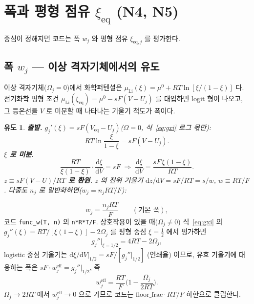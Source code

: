 \documentclass[11pt,a4paper]{article}
\newtheorem*{derivebox}{유도}
\newcommand{\dd}{\mathrm{d}}
\newcommand{\eff}{\mathrm{eff}}
\newcommand{\eq}{\mathrm{eq}}
\newcommand{\code}[1]{\texttt{#1}}
\begin{document}
\section{폭과 평형 점유 $\xi_\eq$ (N4, N5)}\label{sec:width}
중심이 정해지면 코드는 폭 $w_j$ 와 평형 점유 $\xi_{\eq,j}$ 를 평가한다.

\subsection{폭 $w_j$ — 이상 격자기체에서의 유도}

이상 격자기체($\Omega_j=0$)에서 화학퍼텐셜은 $\mu_{\mathrm{Li}}(\xi)=\mu^0+RT\ln[\xi/(1-\xi)]$ 다.
전기화학 평형 조건 $\mu_{\mathrm{Li}}(\xi_\eq)=\mu^0-sF(V-U_j)$ 를 대입하면 logit 형이 나오고, 그 등온선을 $V$ 로 미분할 때 나타나는 기울기 척도가 폭이다.

\begin{derivebox}
\textbf{출발.} $g_j'(\xi)=sF(V_\eq-U_j)$($\Omega=0$, 식~\eqref{eq:gxi} 로그 몫만):
\begin{equation*}
RT\ln\frac{\xi}{1-\xi}=sF(V-U_j).
\end{equation*}
\textbf{$\xi$ 로 미분.}
\begin{equation*}
\frac{RT}{\xi(1-\xi)}\cdot\frac{\dd\xi}{\dd V}=sF
\;\Longrightarrow\;
\frac{\dd\xi}{\dd V}=\frac{sF\,\xi(1-\xi)}{RT}.
\end{equation*}
\textbf{$z\equiv sF(V-U)/RT$ 로 환원.} $z$ 의 전위 기울기 $\dd z/\dd V=sF/RT=s/w$, $w\equiv RT/F$. 다중도 $n_j$ 로 일반화하면($w_j=n_jRT/F$):
\end{derivebox}
\begin{equation}
w_j=\frac{n_jRT}{F}\qquad(\text{기본 폭}),
\label{eq:wbase}
\end{equation}
코드 \code{func\_w(T, n)} 의 \code{n*R*T/F}. 상호작용이 있을 때($\Omega_j\ne0$) 식~\eqref{eq:gxi} 의
$g_j''(\xi)=RT/[\xi(1-\xi)]-2\Omega_j$ 를 평형 중심 $\xi=\tfrac12$ 에서 평가하면
\begin{equation*}
g_j''\!\Big|_{\xi=1/2}=4RT-2\Omega_j,
\end{equation*}
logistic 중심 기울기는 $\dd\xi/\dd V|_{1/2}=sF/[g_j''|_{1/2}]$ (연쇄율) 이므로, 유효 기울기에 대응하는 폭은
$sF\cdot w_j^\eff=g_j''|_{1/2}$, 즉
\begin{equation}
w_j^\eff=\frac{RT}{F}\Big(1-\frac{\Omega_j}{2RT}\Big).
\label{eq:weff}
\end{equation}
$\Omega_j\to2RT$ 에서 $w_j^\eff\to0$ 으로 가므로 코드는 $\mathrm{floor\_frac}\cdot RT/F$ 하한으로 클립한다.
\end{document}
